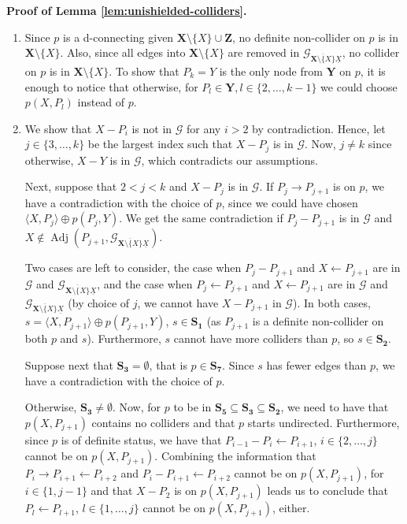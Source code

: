\documentclass[11pt]{article}
\DeclareMathOperator{\Adj}{Adj}
\newcommand{\mb}[1]{\mathbf{#1}}
\newcommand{\g}[1][G]{\mathcal{#1}}
\newenvironment{proofofnoqed}[1][]{\noindent \textbf{Proof of #1.}}{}
\begin{document}
\begin{proofofnoqed}[Lemma \ref{lem:unishielded-colliders}]
    \begin{enumerate}[label = (\roman*)]
        \item[\ref{unishielded-coll-case0}] Since $p$ is a d-connecting given $\mb{X} \setminus \{X\} \cup \mb{Z}$, no definite non-collider on $p$ is in $\mb{X} \setminus \{X\}$. Also, since all edges into $\mb{X} \setminus \{X\}$ are removed in $\g_{\overline{\mb{X} \setminus \{X\}} \underline{X}}$, no collider on $p$ is in $\mb{X} \setminus \{X\}$. To show that $P_k = Y$ is the only node from $\mb{Y}$ on $p$, it is enough to notice that otherwise, for $P_l \in \mb{Y}, l \in \{2, \dots, k-1\}$ we could choose $p(X, P_l)$ instead of $p$.

        \item[\ref{unishielded-coll-case1}] We show that $X - P_i$ is not in $\g$ for any $i > 2$ by contradiction. Hence, let $j \in \{3, \dots, k\}$ be the largest index such that $X - P_j$ is in $\g$. Now, $j \neq k$ since otherwise, $X - Y$ is in $\g$, which contradicts our assumptions. 

        Next, suppose that $2< j < k$ and $X - P_j$ is in $\g$. If $P_j \to P_{j+1}$ is on $p$, we have a contradiction with the choice of $p$, since we could have chosen $\langle X, P_j \rangle \oplus p(P_j, Y)$. We get the same contradiction if $P_j - P_{j+1}$ is in $\g$ and $X \notin \Adj(P_{j+1}, \g_{\overline{\mb{X} \setminus \{X\}} \underline{X}})$. 

        Two cases are left to consider, the case when $P_j - P_{j+1}$ and $X \gets P_{j+1}$ are in $\g$ and $ \g_{\overline{\mb{X} \setminus \{X\}} \underline{X}}$, and the case when $P_j \gets P_{j+1}$ and $X \gets P_{j+1}$ are in $\g$ and $ \g_{\overline{\mb{X} \setminus \{X\}} \underline{X}}$ (by choice of $j$, we cannot have $X - P_{j+1}$ in $\g$). In both cases, $s = \langle X, P_{j+1} \rangle \oplus p(P_{j+1}, Y)$, $s \in \mb{S_1}$ (as $P_{j+1}$ is a definite non-collider on both $p$ and $s$). Furthermore, $s$ cannot have more colliders than $p$, so $s \in \mb{S_2}$. 

        Suppose next that $\mb{S_3} = \emptyset$, that is $p \in \mb{S_7}$. Since $s$ has fewer edges than $p$, we have a contradiction with the choice of $p$.

        Otherwise, $\mb{S_3} \neq \emptyset$. Now, for $p$ to be in $\mb{S_5} \subseteq \mb{S_3} \subseteq \mb{S_2}$, we need to have that $p(X,P_{j+1})$ contains no colliders and that $p$ starts undirected. Furthermore, since $p$ is of definite status, we have that $P_{i-1} - P_i \gets P_{i+1}$, $i \in \{2, \dots, j\}$ cannot be on $p(X,P_{j+1})$. Combining the information that $P_{i} \to P_{i+1} \gets P_{i+2}$ and $P_{i} - P_{i+1} \gets P_{i+2}$ cannot be on $p(X,P_{j+1})$, for $i \in \{1, j-1\}$ and that $X - P_2$ is on $p(X,P_{j+1})$ leads us to conclude that $P_l \gets P_{l+1}$, $l \in \{1,\dots, j\}$ cannot be on $p(X,P_{j+1})$, either. 


\end{enumerate}
\end{proofofnoqed}
\end{document}
